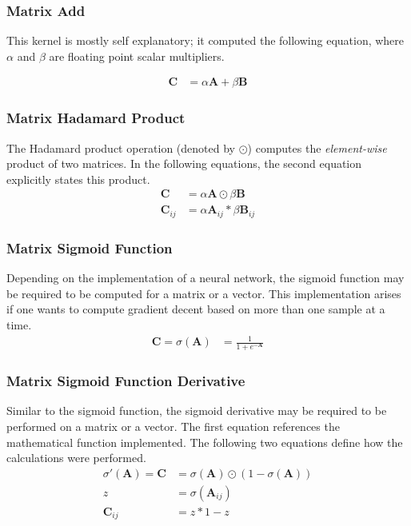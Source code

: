 \documentclass[11pt]{article}
\begin{document}
\subsubsection{Matrix Add}
This kernel is mostly self explanatory; it computed the following equation, where $\alpha$ and $\beta$ are floating point scalar multipliers.

\begin{align*}
	\mathbf{C} & = \alpha \mathbf{A} + \beta \mathbf{B} 
\end{align*}

\subsubsection{Matrix Hadamard Product}
The Hadamard product operation (denoted by $\odot$) computes the \textit{element-wise} product of two matrices. In the following equations, the second equation explicitly states this product.
\begin{align*}
	\mathbf{C}      & = \alpha \mathbf{A} \odot \beta \mathbf{B}       \\
	\mathbf{C}_{ij} & = \alpha \mathbf{A}_{ij} * \beta \mathbf{B}_{ij} 
\end{align*}

\subsubsection{Matrix Sigmoid Function}
Depending on the implementation of a neural network, the sigmoid function may be required to be computed for a matrix or a vector. This implementation arises if one wants to compute gradient decent based on more than one sample at a time.
\begin{align*}
	\mathbf{C} = \sigma(\mathbf{A}) & = \frac{1}{1 + e^{-\mathbf{A}}} 
\end{align*}

\subsubsection{Matrix Sigmoid Function Derivative}
Similar to the sigmoid function, the sigmoid derivative may be required to be performed on a matrix or a vector. The first equation references the mathematical function implemented. The following two equations define how the calculations were performed.
\begin{align*}
	\sigma'(\mathbf{A}) = \mathbf{C} & = \sigma(\mathbf{A}) \odot (1 - \sigma(\mathbf{A})) \\
	z                                & = \sigma(\mathbf{A}_{ij})                           \\
	\mathbf{C}_{ij}                  & = z * 1-z                                           
\end{align*}
\end{document}
